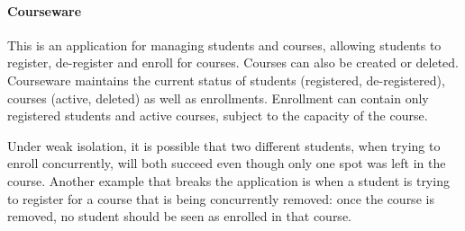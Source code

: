 \vspace{-2mm}	
\paragraph{Courseware \cite{DBLP:conf/esop/NairP020}}
This is an application for managing students and courses, allowing students
to register, de-register and enroll for courses. Courses can also be created 
or deleted. Courseware maintains the current status of
students (registered, de-registered), courses (active, deleted) as well as
enrollments.
Enrollment can contain only registered students and active courses, subject to the capacity
of the course.

Under weak isolation, it is possible that two different students, when trying to
enroll concurrently, will both succeed even though only one spot was left in the
course. Another example that breaks the application is when a student is trying
to register for a course that is being concurrently removed: once the course is
removed, no student should be seen as enrolled in that course.



\vspace{-2mm}
